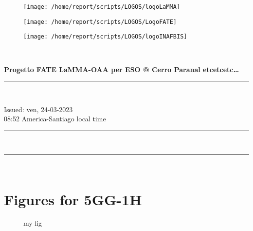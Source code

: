 \documentclass[11pt,english]{article}
\newcommand{\HRule}{\rule{\linewidth}{0.5mm}}
\begin{document}
\begin{figure}
\begin{center}
\hspace{1.5cm}
\parbox{5.5cm}{\texttt{[image: /home/report/scripts/LOGOS/logoLaMMA]}}
\hspace{.3cm}
\parbox{5.5cm}{\texttt{[image: /home/report/scripts/LOGOS/LogoFATE]}}
\hspace{.3cm}
\parbox{5.5cm}{\texttt{[image: /home/report/scripts/LOGOS/logoINAFBIS]}}
\hspace{.1cm}
\vspace{1.2cm}
\end{center}
\end{figure}

\begin{center}
\HRule \\[0.4cm]
\Huge{\textbf{Progetto FATE LaMMA-OAA per ESO @ Cerro Paranal etcetcetc\ldots}}
\HRule \\[0.4cm]
\end{center}

\begin{center}
\vspace{2cm}\Huge{Issued: ven, 24-03-2023\\ 08:52 America-Santiago local time}
\end{center}

\begin{center}
\HRule \\[0.1cm]
\tableofcontents
\HRule \\[0.1cm]
\end{center}
\newpage
\clearpage
\section{Figures for 5GG-1H}

\clearpage
\begin{figure}
\begin{minipage}{.5\linewidth}
\centering
{}
\end{minipage}%
\begin{minipage}{.5\linewidth}
\centering
{}
\end{minipage}\par\medskip
\centering
{}
\caption{my fig}
\label{fig:main}
\end{figure}
\end{document}
